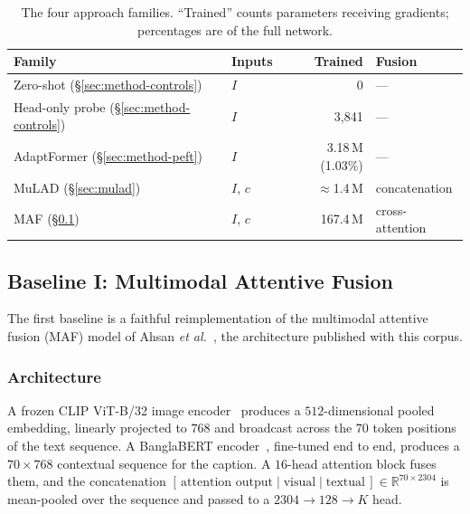 \documentclass[conference]{IEEEtran}
\begin{document}
\begin{table}[t]
\caption{The four approach families. ``Trained'' counts parameters receiving
gradients; percentages are of the full network.}
\label{tab:approaches}
\centering
\footnotesize
\begin{tabular}{llrl}
\toprule
Family & Inputs & Trained & Fusion \\
\midrule
Zero-shot (\S\ref{sec:method-controls})     & $I$      & 0                & --- \\
Head-only probe (\S\ref{sec:method-controls}) & $I$    & 3{,}841          & --- \\
AdaptFormer (\S\ref{sec:method-peft})       & $I$      & 3.18\,M (1.03\%) & --- \\
MuLAD (\S\ref{sec:mulad})                   & $I$, $c$ & $\approx$1.4\,M  & concatenation \\
MAF (\S\ref{sec:maf})                       & $I$, $c$ & 167.4\,M         & cross-attention \\
\bottomrule
\end{tabular}
\end{table}

\subsection{Baseline I: Multimodal Attentive Fusion}
\label{sec:maf}

The first baseline is a faithful reimplementation of the multimodal attentive
fusion (MAF) model of Ahsan \emph{et al.}~\cite{ahsan2024}, the architecture
published with this corpus.

\subsubsection{Architecture}
A frozen CLIP ViT-B/32 image encoder~\cite{radford2021} produces a $512$-dimensional
pooled embedding, linearly projected to $768$ and broadcast across the $70$
token positions of the text sequence. A BanglaBERT encoder~\cite{sarker2020},
fine-tuned end to end, produces a $70 \times 768$ contextual sequence for the
caption. A $16$-head attention block fuses them, and the concatenation
$[\,\text{attention output} \mid \text{visual} \mid \text{textual}\,] \in
\mathbb{R}^{70 \times 2304}$ is mean-pooled over the sequence and passed to a
$2304 \rightarrow 128 \rightarrow K$ head.
\end{document}
